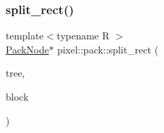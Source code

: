 \mbox{\label{namespacepixel_1_1pack_a9f6003cbffbaf9c4694d88a2c10f2811}} 
\subsubsection{\texorpdfstring{split\+\_\+rect()}{split\_rect()}}
{\footnotesize\ttfamily template$<$typename R $>$ \\
\hyperlink{structpixel_1_1pack_1_1_pack_node}{Pack\+Node}$\ast$ pixel\+::pack\+::split\+\_\+rect (\begin{DoxyParamCaption}\item[{\hyperlink{structpixel_1_1pack_1_1_pack_node}{Pack\+Node} $\ast$}]{tree,  }\item[{const R \&}]{block }\end{DoxyParamCaption})}

